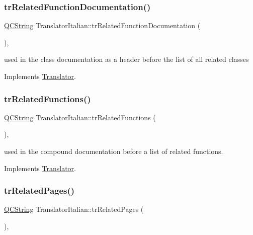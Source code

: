 \subsubsection{\texorpdfstring{trRelatedFunctionDocumentation()}{trRelatedFunctionDocumentation()}}
{\footnotesize\ttfamily \mbox{\hyperlink{class_q_c_string}{Q\+C\+String}} Translator\+Italian\+::tr\+Related\+Function\+Documentation (\begin{DoxyParamCaption}{ }\end{DoxyParamCaption})\hspace{0.3cm}{\ttfamily [inline]}, {\ttfamily [virtual]}}

used in the class documentation as a header before the list of all related classes 

Implements \mbox{\hyperlink{class_translator}{Translator}}.

\mbox{\label{class_translator_italian_ad87f9c040ad9cd778a70fbf929002f6c}} 
\subsubsection{\texorpdfstring{trRelatedFunctions()}{trRelatedFunctions()}}
{\footnotesize\ttfamily \mbox{\hyperlink{class_q_c_string}{Q\+C\+String}} Translator\+Italian\+::tr\+Related\+Functions (\begin{DoxyParamCaption}{ }\end{DoxyParamCaption})\hspace{0.3cm}{\ttfamily [inline]}, {\ttfamily [virtual]}}

used in the compound documentation before a list of related functions. 

Implements \mbox{\hyperlink{class_translator}{Translator}}.

\mbox{\label{class_translator_italian_aa5462f64304452c2eabe4b42965beba4}} 
\subsubsection{\texorpdfstring{trRelatedPages()}{trRelatedPages()}}
{\footnotesize\ttfamily \mbox{\hyperlink{class_q_c_string}{Q\+C\+String}} Translator\+Italian\+::tr\+Related\+Pages (\begin{DoxyParamCaption}{ }\end{DoxyParamCaption})\hspace{0.3cm}{\ttfamily [inline]}, {\ttfamily [virtual]}}

